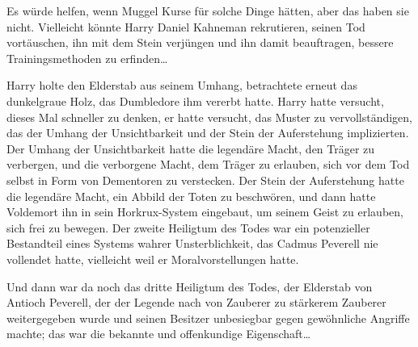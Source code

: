Es würde helfen, wenn Muggel Kurse für solche Dinge hätten, aber das haben sie nicht.
Vielleicht könnte Harry Daniel Kahneman rekrutieren, seinen Tod vortäuschen, ihn mit dem Stein verjüngen und ihn damit beauftragen, bessere Trainingsmethoden zu erfinden…

Harry holte den Elderstab aus seinem Umhang, betrachtete erneut das dunkelgraue Holz, das Dumbledore ihm vererbt hatte. Harry hatte versucht, dieses Mal schneller zu denken, er hatte versucht, das Muster zu vervollständigen, das der Umhang der Unsichtbarkeit und der Stein der Auferstehung implizierten. Der Umhang der Unsichtbarkeit hatte die legendäre Macht, den Träger zu verbergen, und die verborgene Macht, dem Träger zu erlauben, sich vor dem Tod selbst in Form von Dementoren zu verstecken. Der Stein der Auferstehung hatte die legendäre Macht, ein Abbild der Toten zu beschwören, und dann hatte Voldemort ihn in sein Horkrux-System eingebaut, um seinem Geist zu erlauben, sich frei zu bewegen. Der zweite Heiligtum des Todes war ein potenzieller Bestandteil eines Systems wahrer Unsterblichkeit, das Cadmus Peverell nie vollendet hatte, vielleicht weil er Moralvorstellungen hatte.

Und dann war da noch das dritte Heiligtum des Todes, der Elderstab von Antioch Peverell, der der Legende nach von Zauberer zu stärkerem Zauberer weitergegeben wurde und seinen Besitzer unbesiegbar gegen gewöhnliche Angriffe machte; das war die bekannte und offenkundige Eigenschaft…

